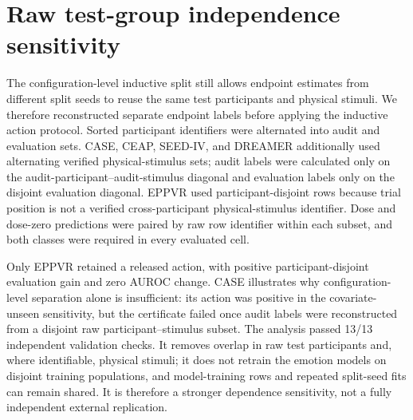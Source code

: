 \documentclass[preprint,12pt]{elsarticle}
\begin{document}
\section{Raw test-group independence sensitivity}

The configuration-level inductive split still allows endpoint estimates from different split seeds to reuse the same test participants and physical stimuli. We therefore reconstructed separate endpoint labels before applying the inductive action protocol. Sorted participant identifiers were alternated into audit and evaluation sets. CASE, CEAP, SEED-IV, and DREAMER additionally used alternating verified physical-stimulus sets; audit labels were calculated only on the audit-participant--audit-stimulus diagonal and evaluation labels only on the disjoint evaluation diagonal. EPPVR used participant-disjoint rows because trial position is not a verified cross-participant physical-stimulus identifier. Dose and dose-zero predictions were paired by raw row identifier within each subset, and both classes were required in every evaluated cell.

\begin{table}[!htbp]
\centering
\caption{Nested configuration- and raw-test-group independence sensitivity. Return-original actions have zero gain by construction and do not demonstrate calibration effectiveness.}
\label{tab:raw-group-independence}
\small
{}
\end{table}

Only EPPVR retained a released action, with positive participant-disjoint evaluation gain and zero AUROC change. CASE illustrates why configuration-level separation alone is insufficient: its action was positive in the covariate-unseen sensitivity, but the certificate failed once audit labels were reconstructed from a disjoint raw participant--stimulus subset. The analysis passed 13/13 independent validation checks. It removes overlap in raw test participants and, where identifiable, physical stimuli; it does not retrain the emotion models on disjoint training populations, and model-training rows and repeated split-seed fits can remain shared. It is therefore a stronger dependence sensitivity, not a fully independent external replication.
\end{document}
